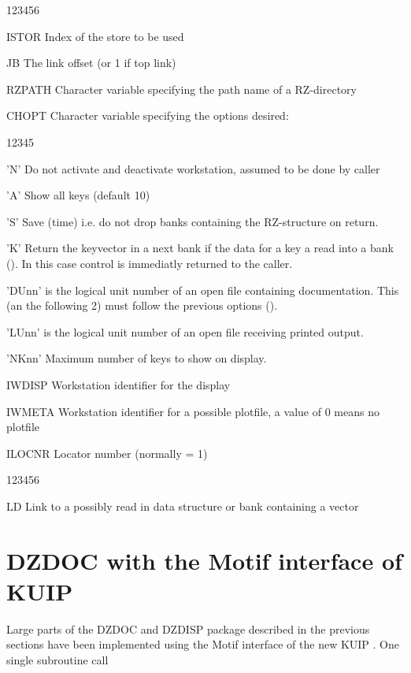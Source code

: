 \Idesc
 
\begin{DLtt}{123456}
\item[ISTOR]  Index of the store to be used
\item[JB]     The link offset (or 1 if top link)
\item[RZPATH] Character variable specifying the path name of a RZ-directory
\item[CHOPT]  Character variable specifying the options desired:
  \begin{DLtt}{12345}
    \item['N']    Do not activate and deactivate workstation,
                  assumed to be done by caller
    \item['A']    Show all keys (default 10)
    \item['S']    Save (time) i.e. do not drop banks containing
                  the RZ-structure on return.
    \item['K']    Return the keyvector in a next bank if the data for
                  a key a read into a bank (). 
                  In this case control is immediatly returned to the caller.
    \item['DUnn']  is the logical unit number of an open file
                  containing documentation. This (an the following 2)
                  must follow the previous options ().
    \item['LUnn']  is the logical unit number of an open file
                  receiving printed output.
    \item['NKnn'] Maximum number of keys to show on display.
  \end{DLtt}
\item[IWDISP] Workstation identifier for the display
\item[IWMETA] Workstation identifier for a possible plotfile,
              a value of 0 means no plotfile
\item[ILOCNR] Locator number (normally = 1)
\end{DLtt}
 
\Odesc
 
\begin{DLtt}{123456}
\item[LD]  Link to a possibly read in data structure or bank containing 
           a vector
\end{DLtt}
 
\section{DZDOC with the Motif interface of KUIP}
Large parts of the DZDOC and DZDISP package described in the previous
sections have been implemented using the Motif \cite{bib-Motif} 
interface of the new KUIP \cite{bib-KUIP}. One single subroutine 
call
 
